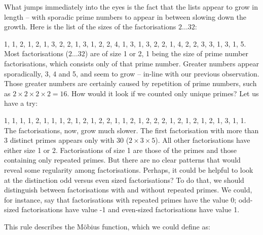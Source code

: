 \documentclass{scrreprt}
\begin{document}
What jumps immediately into the eyes is
the fact that the lists appear to grow in length --
with sporadic prime numbers to appear in between
slowing down the growth.
Here is the list of the sizes of the factorisations $2\dots 32$:

1, 1, 2, 1, 2, 1, 3, 2, 2, 1, 3, 1, 2, 2, 4, 
1, 3, 1, 3, 2, 2, 1, 4, 2, 2, 3, 3, 1, 3, 1, 5.\\

Most factorisations ($2\dots 32$) are of size 1 or 2,
1 being the size of prime number factorisations,
which consists only of that prime number.
Greater numbers appear sporadically, 3, 4 and 5,
and seem to grow -- in-line with our previous observation.
Those greater numbers are certainly caused by 
repetition of prime numbers, such as $2 \times 2 \times 2 \times 2 = 16$.
How would it look if we counted only unique primes?
Let us have a try:

1, 1, 1, 1, 2, 1, 1, 1, 2, 1, 2, 1, 2, 2, 
1, 1, 2, 1, 2, 2, 2, 1, 2, 1, 2, 1, 2, 1, 3, 1, 1.\\

The factorisations, now, grow much slower.
The first factorisation with more than 3 distinct primes
appears only with 30 ($2 \times 3 \times 5$).
All other factorisations have either size 1 or 2.
Factorisations of size 1 are those of the primes 
and those containing only repeated primes.
But there are no clear patterns that would reveal some
regularity among factorisations.
Perhaps, it could be helpful to look at the distinction
odd versus even sized factorisations?
To do that, we should distinguish between factorisations
with and without repeated primes.
We could, for instance, say that
factorisations with repeated primes have the value 0;
odd-sized factorisations have value -1 and
even-sized factorisations have value 1.

This rule describes the Möbius function, 
which we could define as:
\end{document}

